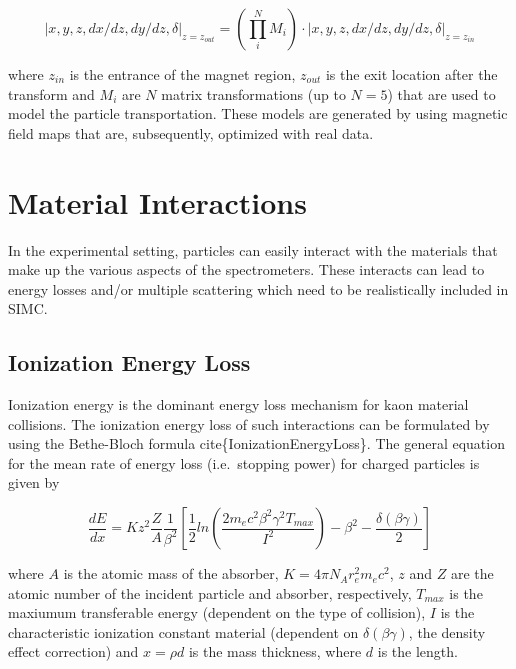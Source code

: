 \documentclass[
]{report}
\begin{document}
\begin{equation} 
  \left|x,y,z,dx/dz,dy/dz,\delta\right|_{z=z_{out}}=(\prod^N_iM_i)\cdot\left|x,y,z,dx/dz,dy/dz,\delta\right|_{z=z_{in}}
  \label{eq:cosy_transform} 
\end{equation}

\noindent where \(z_{in}\) is the entrance of the magnet region,
\(z_{out}\) is the exit location after the transform and \(M_i\) are
\(N\) matrix transformations (up to \(N=5\)) that are used to model the
particle transportation. These models are generated by using magnetic
field maps that are, subsequently, optimized with real data.

\hypertarget{Section-6.4}{%
\section{Material Interactions}\label{Section-6.4}}

In the experimental setting, particles can easily interact with the
materials that make up the various aspects of the spectrometers. These
interacts can lead to energy losses and/or multiple scattering which
need to be realistically included in SIMC.

\hypertarget{ionization-energy-loss}{%
\subsection{Ionization Energy Loss}\label{ionization-energy-loss}}

Ionization energy is the dominant energy loss mechanism for kaon
material collisions. The ionization energy loss of such interactions can
be formulated by using the Bethe-Bloch formula
cite\{IonizationEnergyLoss\}. The general equation for the mean rate of
energy loss (i.e.~stopping power) for charged particles is given by

\begin{equation} 
  \frac{dE}{dx}=Kz^2\frac{Z}{A}\frac{1}{\beta^2}[\frac{1}{2}ln(\frac{2m_ec^2\beta^2\gamma^2T_{max}}{I^2})-\beta^2-\frac{\delta(\beta\gamma)}{2}]
  \label{eq:stop_power} 
\end{equation}

\noindent where \(A\) is the atomic mass of the absorber,
\(K=4\pi N_Ar^2_em_ec^2\), \(z\) and \(Z\) are the atomic number of the
incident particle and absorber, respectively, \(T_{max}\) is the
maxiumum transferable energy (dependent on the type of collision), \(I\)
is the characteristic ionization constant material (dependent on
\(\delta(\beta\gamma)\), the density effect correction) and \(x=\rho d\)
is the mass thickness, where \(d\) is the length.
\end{document}
